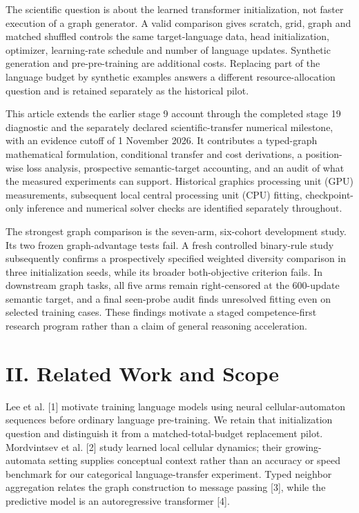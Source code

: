 \documentclass[10pt,letterpaper,twocolumn]{article}
\begin{document}
The scientific question is about the learned transformer initialization, not faster execution of a graph generator. A valid comparison gives scratch, grid, graph and matched shuffled controls the same target-language data, head initialization, optimizer, learning-rate schedule and number of language updates. Synthetic generation and pre-pre-training are additional costs. Replacing part of the language budget by synthetic examples answers a different resource-allocation question and is retained separately as the historical pilot.

This article extends the earlier stage 9 account through the completed stage 19 diagnostic and the separately declared scientific-transfer numerical milestone, with an evidence cutoff of 1 November 2026. It contributes a typed-graph mathematical formulation, conditional transfer and cost derivations, a position-wise loss analysis, prospective semantic-target accounting, and an audit of what the measured experiments can support. Historical graphics processing unit (GPU) measurements, subsequent local central processing unit (CPU) fitting, checkpoint-only inference and numerical solver checks are identified separately throughout.

The strongest graph comparison is the seven-arm, six-cohort development study. Its two frozen graph-advantage tests fail. A fresh controlled binary-rule study subsequently confirms a prospectively specified weighted diversity comparison in three initialization seeds, while its broader both-objective criterion fails. In downstream graph tasks, all five arms remain right-censored at the 600-update semantic target, and a final seen-probe audit finds unresolved fitting even on selected training cases. These findings motivate a staged competence-first research program rather than a claim of general reasoning acceleration.

\section*{II. Related Work and Scope}
Lee et al. [1] motivate training language models using neural cellular-automaton sequences before ordinary language pre-training. We retain that initialization question and distinguish it from a matched-total-budget replacement pilot. Mordvintsev et al. [2] study learned local cellular dynamics; their growing-automata setting supplies conceptual context rather than an accuracy or speed benchmark for our categorical language-transfer experiment. Typed neighbor aggregation relates the graph construction to message passing [3], while the predictive model is an autoregressive transformer [4].
\end{document}
